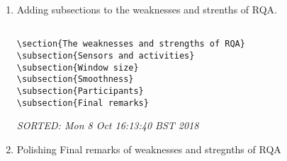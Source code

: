 \documentclass[10pt]{article}
\begin{document}
\begin{enumerate}

\item Adding subsections to the weaknesses and strenths of RQA.

\begin{verbatim}

\section{The weaknesses and strengths of RQA}
\subsection{Sensors and activities}
\subsection{Window size}
\subsection{Smoothness}
\subsection{Participants}
\subsection{Final remarks}

\end{verbatim}
\textit{
SORTED: 
Mon  8 Oct 16:13:40 BST 2018
}
\\


\item  Polishing Final remarks of weaknesses and stregnths of RQA

\begin{verbatim}


\end{verbatim}
\end{enumerate}
\end{document}
